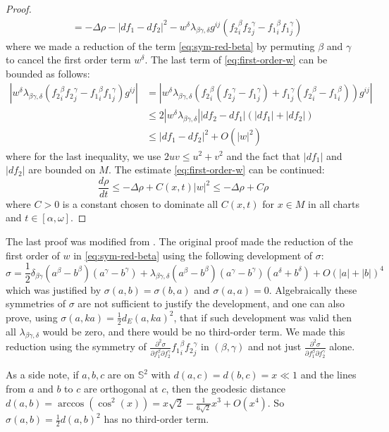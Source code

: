 \begin{proof}
\begin{align}
		   & = -\Delta \rho - |df_1 -df_2|^2 - w^\delta \lambda_{\beta\gamma,\delta}g^{ij}\left(  {f_2}^\beta_i {f_2}^\gamma_j - {f_1}^\beta_i {f_1}^\gamma_j  \right) \label{eq:first-order-w}
\end{align}
where we made a reduction of the term \eqref{eq:sym-red-beta} by permuting \(\beta\) and
\(\gamma\) to cancel the first order term \(w^\delta\). The last term of \eqref{eq:first-order-w} can be bounded as follows:
\begin{align*}
    \left | w^\delta \lambda_{\beta\gamma,\delta}\left({f_2}^\beta_i {f_2}^\gamma_j -
{f_1}^\beta_i {f_1}^\gamma_j\right) g^{ij} \right| &=   \left | w^\delta \lambda_{\beta\gamma,\delta}\left({f_2}^\beta_i ({f_2}^\gamma_j - {f_1}^\gamma_j) + {f_1}^\gamma_j({f_2}^\beta_i -
{f_1}^\beta_i) \right) g^{ij} \right| \\
	       &\leq 2 |w^\delta \lambda_{\beta\gamma,\delta}| |df_2 -df_1| (|df_1| + |df_2|)\\
	       &\leq |df_1 - df_2|^2 + O(|w|^2)
\end{align*}
where for the last inequality, we use \(2uv \leq u^2 + v^2\) and the fact that \(|df_1|\) and \(|df_2|\) are bounded on \(M\). The estimate \eqref{eq:first-order-w} can be
continued:
\[
 \frac{d \rho}{d t}\leq -\Delta\rho + C(x,t) |w|^2 \leq -\Delta \rho + C \rho
\]
where \(C >0\) is a constant chosen to dominate all \(C(x,t)\) for \(x\in M\) in all
charts and \(t\in [\alpha,\omega]\).
\end{proof}

\begin{remark}
\label{rem:hamilton-alg-rig}
The last proof was modified from \cite{hamilton_harmonic_1975}. The original proof
made the reduction of the first order of \(w\) in \eqref{eq:sym-red-beta} using
the following development of \(\sigma\):
\[
 \sigma = \frac{1}{2}\delta_{\beta\gamma} (a^\beta - b^\beta)(a^\gamma - b^\gamma) +
\lambda_{\beta\gamma,\delta} (a^\beta - b^\beta)(a^\gamma -b^\gamma)(a^\delta + b^\delta) + O(|a|+|b|)^4
\]
which was justified by \(\sigma(a,b) = \sigma(b,a)\) and \(\sigma(a,a)=0\). Algebraically these symmetries of \(\sigma\) are not sufficient to justify the
development, and one can also prove, using \(\sigma(a,ka)= \frac{1}{2}d_E(a,ka)^2\), that if such development
was valid then all \(\lambda_{\beta\gamma,\delta}\) would be zero, and there would be no
third-order term. We made this reduction using the symmetry of \(\frac{\partial^2
\sigma}{\partial f_1^\beta \partial f_2^\gamma} {f_1}^\beta_i {f_2}^\gamma_j\) in \((\beta,\gamma)\) and not just \(\frac{\partial^2
\sigma}{\partial f_1^\beta \partial f_2^\gamma}\) alone.

As a side note, if \(a,b,c\) are on \(\mathbb{S}^2\) with \(d(a,c) = d(b,c) = x \ll 1\)
and the lines from \(a\) and \(b\) to \(c\) are orthogonal at \(c\), then the
geodesic distance \(d(a,b) = \arccos(\cos^2(x)) = x\sqrt{2} - \frac{1}{6\sqrt{2}}x^3 +
O(x^4)\). So \(\sigma(a,b) = \frac{1}{2}d(a,b)^2\) has no third-order term.
\end{remark}

